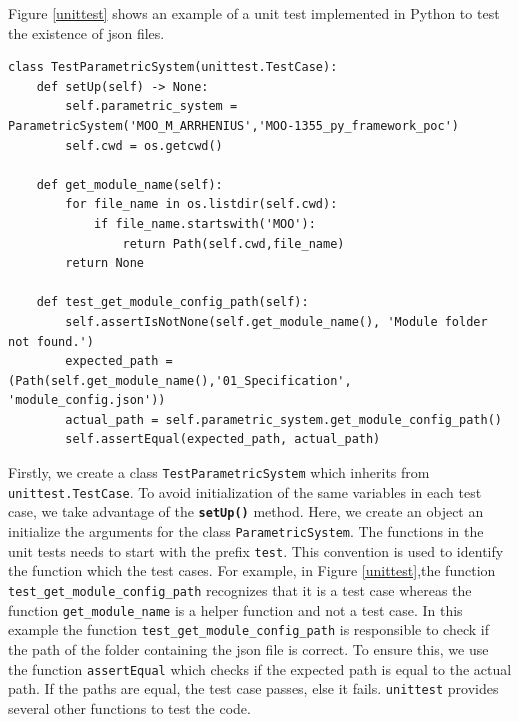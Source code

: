 Figure \ref{unittest} shows an example of a unit test implemented in Python to test the existence of \acrshort{json} files. 
\renewcommand{\lstlistingname}{Code}
\begin{lstlisting}[style=pythoncode, caption={Example of a unit test}, label={unittest}]
class TestParametricSystem(unittest.TestCase):
    def setUp(self) -> None:
        self.parametric_system = ParametricSystem('MOO_M_ARRHENIUS','MOO-1355_py_framework_poc')
        self.cwd = os.getcwd()

    def get_module_name(self):
        for file_name in os.listdir(self.cwd):
            if file_name.startswith('MOO'):
                return Path(self.cwd,file_name)
        return None

    def test_get_module_config_path(self):
        self.assertIsNotNone(self.get_module_name(), 'Module folder not found.')
        expected_path = (Path(self.get_module_name(),'01_Specification', 'module_config.json'))
        actual_path = self.parametric_system.get_module_config_path()
        self.assertEqual(expected_path, actual_path)  
\end{lstlisting}

Firstly, we create a class \texttt{TestParametricSystem} which inherits from \texttt{unittest.TestCase}. To avoid initialization of the same variables in each
test case, we take advantage of the \textbf{\texttt{setUp()}} method. Here, we create an object an initialize the arguments for the class \texttt{ParametricSystem}.
The functions in the unit tests needs to start with the prefix \texttt{test}. This convention is used to identify the function which the test cases. For example, 
in Figure \ref{unittest},the function \texttt{test\_get\_module\_config\_path} recognizes that it is a test case whereas the function \texttt{get\_module\_name}
is a helper function and not a test case. In this example the function \texttt{test\_get\_module\_config\_path} is responsible to check if the path of the folder
containing the \acrshort{json} file is correct. To ensure this, we use the function \texttt{assertEqual} which checks if the expected path is equal to the 
actual path. If the paths are equal, the test case passes, else it fails. \texttt{unittest} provides several other functions to test the code. 

